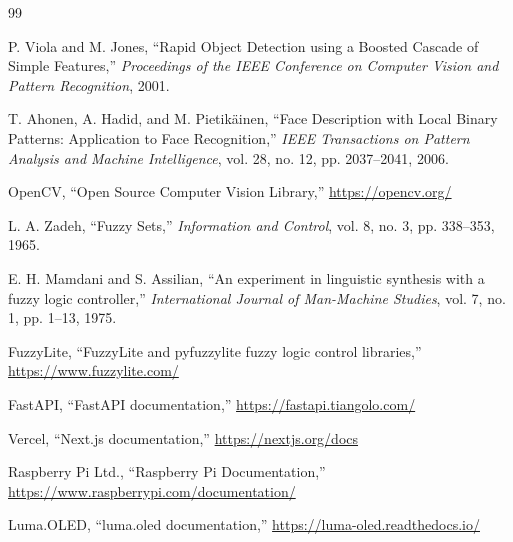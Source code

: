\begin{thebibliography}{99}

P. Viola and M. Jones,
``Rapid Object Detection using a Boosted Cascade of Simple Features,''
\textit{Proceedings of the IEEE Conference on Computer Vision and Pattern Recognition}, 2001.

T. Ahonen, A. Hadid, and M. Pietikäinen,
``Face Description with Local Binary Patterns: Application to Face Recognition,''
\textit{IEEE Transactions on Pattern Analysis and Machine Intelligence}, vol. 28, no. 12, pp. 2037--2041, 2006.

OpenCV,
``Open Source Computer Vision Library,''
\url{https://opencv.org/}

L. A. Zadeh,
``Fuzzy Sets,''
\textit{Information and Control}, vol. 8, no. 3, pp. 338--353, 1965.

E. H. Mamdani and S. Assilian,
``An experiment in linguistic synthesis with a fuzzy logic controller,''
\textit{International Journal of Man-Machine Studies}, vol. 7, no. 1, pp. 1--13, 1975.

FuzzyLite,
``FuzzyLite and pyfuzzylite fuzzy logic control libraries,''
\url{https://www.fuzzylite.com/}

FastAPI,
``FastAPI documentation,''
\url{https://fastapi.tiangolo.com/}

Vercel,
``Next.js documentation,''
\url{https://nextjs.org/docs}

Raspberry Pi Ltd.,
``Raspberry Pi Documentation,''
\url{https://www.raspberrypi.com/documentation/}

Luma.OLED,
``luma.oled documentation,''
\url{https://luma-oled.readthedocs.io/}

\end{thebibliography}
